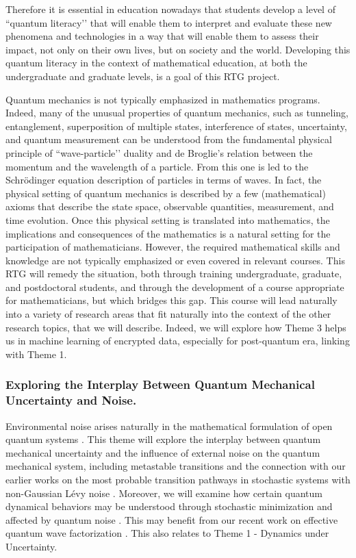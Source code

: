 \documentclass[11pt]{NSFamsart}
\begin{document}
Therefore it is essential in education nowadays that students develop a level of ``quantum literacy’’ \cite{foti2021quantum} that will enable them to interpret and evaluate these new phenomena and technologies in a way that will enable them to assess their impact, not only on their own  lives, but on society and the world. Developing this quantum literacy in the context of mathematical education,    at both the undergraduate and graduate   levels,  is a goal of this RTG project.


Quantum mechanics is not typically emphasized in mathematics programs.  Indeed, many of the unusual properties of quantum mechanics, such as tunneling, entanglement, superposition of multiple states, interference of states, uncertainty, and quantum measurement can be understood from the fundamental physical principle of ``wave-particle’’ duality and de Broglie’s relation between the momentum and the wavelength of a particle.  From this one is led to the Schr\"{o}dinger equation description of particles in terms of waves. In fact, the physical setting of quantum mechanics is described by a few (mathematical) axioms that describe the state space, observable quantities, measurement, and time evolution.  Once this physical setting is translated into mathematics, the implications and consequences of the mathematics is a natural setting for the participation of mathematicians. However, the required mathematical skills and knowledge are not typically emphasized or even covered in relevant courses. This RTG will remedy the situation, both through training undergraduate, graduate, and postdoctoral students, and through the development of a course appropriate for mathematicians, but which bridges this gap. This course will lead naturally into a variety of research areas that fit naturally into the context of the other research topics, that we will describe. Indeed, we will explore how   Theme 3 helps us in machine learning of encrypted data, especially for post-quantum era, linking with Theme 1.  

\subsubsection*{Exploring the Interplay Between Quantum Mechanical Uncertainty and Noise.}  Environmental noise   arises naturally in the mathematical formulation of open quantum systems \cite{Lidar2019LectureNO, Breuer2002TheTO,Macieszczak2021TheoryOC, Griffiths2018IntroductionTQ}. This theme will explore the interplay between quantum mechanical uncertainty and the influence of external noise \cite{Lindgren2019QuantumMC, Nagasawa2000StochasticPI} on the quantum mechanical system, including metastable transitions \cite{Macieszczak2021TheoryOC, Rose2019MetastabilityRA} and the connection with our earlier works on the most probable transition pathways in stochastic systems with non-Gaussian L\'evy noise \cite{ChaoDuanOM}. Moreover, we will examine how certain quantum dynamical behaviors  may be understood through stochastic minimization \cite{Lindgren2019QuantumMC} and affected by quantum noise \cite{Nurdin2019QuantumSP}. This may   benefit from our recent work on effective quantum wave factorization \cite{ZHANG2020132573}. This also relates to   Theme 1 - Dynamics under Uncertainty.
\end{document}
